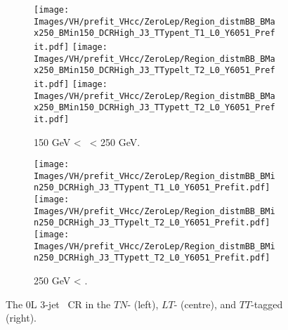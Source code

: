 \begin{figure}[h!]
    \centering
    \begin{subfigure}[b]{\textwidth}
        \centering
        \texttt{[image: Images/VH/prefit\_VHcc/ZeroLep/Region\_distmBB\_BMax250\_BMin150\_DCRHigh\_J3\_TTypent\_T1\_L0\_Y6051\_Prefit.pdf]}
        \texttt{[image: Images/VH/prefit\_VHcc/ZeroLep/Region\_distmBB\_BMax250\_BMin150\_DCRHigh\_J3\_TTypelt\_T2\_L0\_Y6051\_Prefit.pdf]}
        \texttt{[image: Images/VH/prefit\_VHcc/ZeroLep/Region\_distmBB\_BMax250\_BMin150\_DCRHigh\_J3\_TTypett\_T2\_L0\_Y6051\_Prefit.pdf]}
        \caption{150 GeV < \ptv\ < 250 GeV.}
        \label{fig:plots_VHcc_OL_150_CRH_2c_3J}
    \end{subfigure}
    \begin{subfigure}[b]{\textwidth}
        \centering

        \texttt{[image: Images/VH/prefit\_VHcc/ZeroLep/Region\_distmBB\_BMin250\_DCRHigh\_J3\_TTypent\_T1\_L0\_Y6051\_Prefit.pdf]}
        \texttt{[image: Images/VH/prefit\_VHcc/ZeroLep/Region\_distmBB\_BMin250\_DCRHigh\_J3\_TTypelt\_T2\_L0\_Y6051\_Prefit.pdf]}
        \texttt{[image: Images/VH/prefit\_VHcc/ZeroLep/Region\_distmBB\_BMin250\_DCRHigh\_J3\_TTypett\_T2\_L0\_Y6051\_Prefit.pdf]}
        \caption{250 GeV < \ptv.}
        \label{fig:plots_VHcc_OL_250_CRH_2c_3J}
    \end{subfigure}
    \caption{The 0L 3-jet \highdr\ CR in the $TN$- (left), $LT$- (centre), and $TT$-tagged (right).}
    \label{fig:plots_VHcc_OL_CRH_2c_3J}
\end{figure} 

\vspace*{\fill} 

